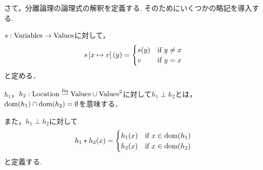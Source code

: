 \documentclass[a4paper, 10pt]{ltjsarticle}
\begin{document}
 さて，分離論理の論理式の解釈を定義する.
 そのためにいくつかの略記を導入する.

 $s:\mathrm{Variables} \to \mathrm{Values} $に対して， 
 \[
  s\left[x \mapsto v\right]\mleft(y\mright)=
   \begin{cases}
    s\mleft(y\mright) &  \text{if $y \neq x$}\\
    v &  \text{if $y=x$}
   \end{cases}
 \]
 と定める．

  $h_1$，$h_2:\mathrm{Location} \mathrel{\overset{\mathrm{fin}}{\rightharpoonup}} \mathrm{Values} \cup \mathrm{Values}^2$に対して$h_1 \perp h_2$とは，
  $\mathdom{h_1} \cap \mathdom{h_2} = \emptyset$を意味する．

  また，$h_1 \perp h_2$に対して
  \[
   h_1 * h_2 \mleft(x\mright)=
   \begin{cases}
    h_1\mleft(x\mright) &  \text{if $x \in \mathdom{h_1}$}\\
    h_2\mleft(x\mright) &  \text{if $x \in \mathdom{h_2}$}
   \end{cases}
  \]
  と定義する.
\end{document}
